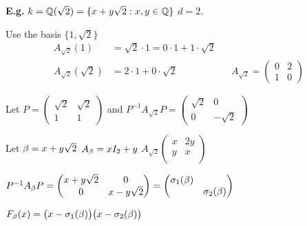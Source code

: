 \documentclass[11pt]{article}
\begin{document}
\textbf{E.g.} $k = \mathbb{Q}(\sqrt{2}) = \{ x+y\sqrt{2} : x,y \in \mathbb{Q} \}$ \hspace{7pt} $d=2$.
\spa

Use the basis $\{ 1, \sqrt{2} \}$
\begin{align*}
	A_{\sqrt{2}} (1) &= \sqrt{2}\cdot 1  = 0 \cdot 1 + 1\cdot \sqrt{2}\\
	A_{\sqrt{2}} (\sqrt{2}) &= 2\cdot 1 + 0\cdot \sqrt{2} &&
	A_{\sqrt{2}} = 
	\begin{pmatrix}
		0 & 2\\
		1 & 0 
	\end{pmatrix}
\end{align*}
\spa

Let $P = 
\begin{pmatrix}
	\sqrt{2} & \sqrt{2}\\
	1 &1
\end{pmatrix}
$ and
$
P^{-1}A_{\sqrt{2}}P=
\begin{pmatrix}
	\sqrt{2} & 0 \\
	0 & -\sqrt{2}
\end{pmatrix}
$
\spac

Let $\beta = x+y\sqrt{2}$ \hspace{7pt}  $A_\beta = x I_2 + y$ \hspace{7pt} $A_{\sqrt{2}} 
\begin{pmatrix}
	x &2y\\
	y&x\\
\end{pmatrix}
$
\spac

$
P^{-1}A_{\beta}P=
\begin{pmatrix}
	x+y\sqrt{2} & 0\\
	0 &x-y\sqrt{2}
\end{pmatrix}
=\begin{pmatrix}
 \sigma_1(\beta) &\\
	& \sigma_2(\beta)
\end{pmatrix}
$
\spa

$F_\beta(x) = \big(x-\sigma_1(\beta)\big)\big(x-\sigma_2(\beta)\big)$
\end{document}
